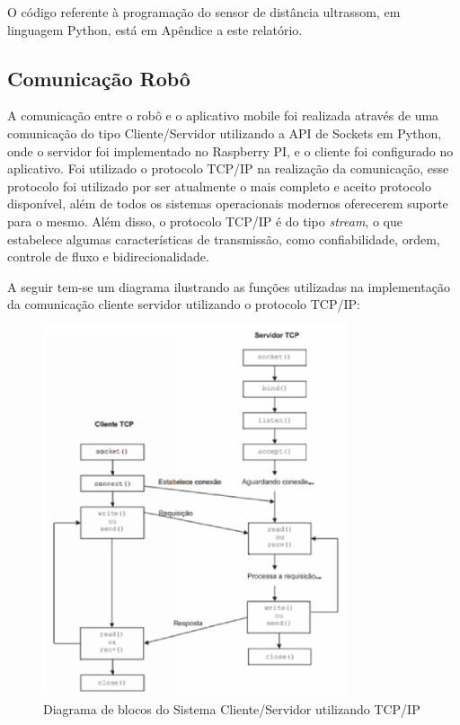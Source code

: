 O código referente à programação do sensor de distância ultrassom, em linguagem Python, está em Apêndice a este relatório.

\subsection{Comunicação Robô}

A comunicação entre o robô e o aplicativo mobile foi realizada através de uma comunicação do tipo Cliente/Servidor utilizando a API de Sockets em Python, onde o servidor foi implementado no Raspberry PI, e o cliente foi configurado no aplicativo. Foi utilizado o protocolo TCP/IP na realização da comunicação, esse protocolo foi utilizado por ser atualmente o mais completo e aceito protocolo disponível, além de todos os sistemas operacionais modernos oferecerem suporte para o mesmo. Além disso, o protocolo TCP/IP é do tipo \textit{stream}, o que estabelece algumas características de transmissão, como confiabilidade, ordem, controle de fluxo e bidirecionalidade.

A seguir tem-se um diagrama ilustrando as funções utilizadas na implementação da comunicação cliente servidor utilizando o protocolo TCP/IP:

\begin{figure}[H]
    \centering
    \includegraphics[width=0.8\textwidth]{figuras/diagrama_socket.eps}
    \caption{Diagrama de blocos do Sistema Cliente/Servidor utilizando TCP/IP}
    \label{fig:diagrama_socket}
\end{figure}

